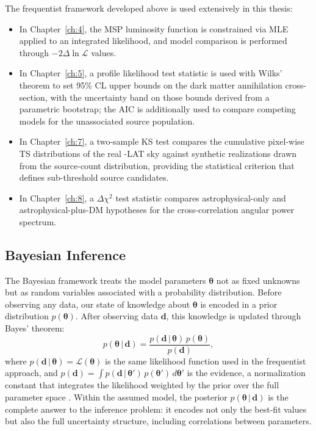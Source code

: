 The frequentist framework developed above is used extensively in this thesis:
\begin{itemize}
	\item In Chapter~\ref{ch:4}, the MSP luminosity function is constrained via MLE applied to an integrated likelihood, and model comparison is performed through $-2\Delta\ln\mathcal{L}$ values.
	\item In Chapter~\ref{ch:5}, a profile likelihood test statistic is used with Wilks' theorem to set 95\% CL upper bounds on the dark matter annihilation cross-section, with the uncertainty band on those bounds derived from a parametric bootstrap; the AIC is additionally used to compare competing models for the unassociated source population.
	\item In Chapter~\ref{ch:7}, a two-sample KS test compares the cumulative pixel-wise TS distributions of the real \Fermi-LAT sky against synthetic realizations drawn from the source-count distribution, providing the statistical criterion that defines sub-threshold source candidates.
	\item In Chapter~\ref{ch:8}, a $\Delta\chi^2$ test statistic compares astrophysical-only and astrophysical-plus-DM hypotheses for the cross-correlation angular power spectrum.
\end{itemize}


\subsection{Bayesian Inference}
\label{sec:3.1.3}
The Bayesian framework treats the model parameters $\boldsymbol{\theta}$ not as fixed unknowns but as random variables associated with a probability distribution.
Before observing any data, our state of knowledge about $\boldsymbol{\theta}$ is encoded in a prior distribution $p(\boldsymbol{\theta})$.
After observing data $\mathbf{d}$, this knowledge is updated through Bayes' theorem:
\begin{equation}
	p(\boldsymbol{\theta} \,|\, \mathbf{d}) = \frac{p(\mathbf{d} \,|\, \boldsymbol{\theta}) \, p(\boldsymbol{\theta})}{p(\mathbf{d})},
	\label{eq:bayes}
\end{equation}
where $p(\mathbf{d} \,|\, \boldsymbol{\theta}) = \mathcal{L}(\boldsymbol{\theta})$ is the same likelihood function used in the frequentist approach, and $p(\mathbf{d}) = \int p(\mathbf{d} \,|\, \boldsymbol{\theta}') \, p(\boldsymbol{\theta}') \, d\boldsymbol{\theta}'$ is the evidence, a normalization constant that integrates the likelihood weighted by the prior over the full parameter space \cite{bishop}.
Within the assumed model, the posterior $p(\boldsymbol{\theta} \,|\, \mathbf{d})$ is the complete answer to the inference problem: it encodes not only the best-fit values but also the full uncertainty structure, including correlations between parameters.

